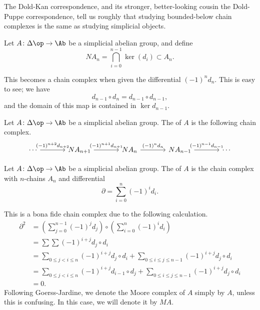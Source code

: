 \documentclass[main.tex]{subfiles}
\begin{document}
The Dold-Kan correspondence, and its stronger, better-looking cousin the Dold-Puppe correspondence, tell us roughly that studying bounded-below chain complexes is the same as studying simplicial objects.

Let $A\colon \Delta\op \to \Ab$ be a simplicial abelian group, and define
\begin{equation*}
  NA_{n} = \bigcap_{i = 0}^{n-1} \ker(d_{i}) \subset A_{n}.
\end{equation*}

This becomes a chain complex when given the differential $(-1)^{n}d_{n}$. This is easy to see; we have
\begin{equation*}
  d_{n-1} \circ d_{n} = d_{n-1} \circ d_{n-1},
\end{equation*}
and the domain of this map is contained in $\ker d_{n-1}$.

\begin{definition}
  \label{def:normalized_chain_complex}
  Let $A\colon \Delta\op \to \Ab$ be a simplicial abelian group. The  of $A$ is the following chain complex.
  \begin{equation*}
    \begin{tikzcd}[column sep=large]
      \cdots
      \arrow[r, "(-1)^{n+2}d_{n+2}"]
      & N A_{n+1}
      \arrow[r, "(-1)^{n+1}d_{n+1}"]
      & N A_{n}
      \arrow[r, "(-1)^{n}d_{n}"]
      & N A_{n-1}
      \arrow[r, "(-1)^{n-1}d_{n-1}"]
      & \cdots
    \end{tikzcd}
  \end{equation*}
\end{definition}

\begin{definition}
  \label{def:moore_complex}
  Let $A\colon \Delta\op \to \Ab$ be a simplicial abelian group. The  of $A$ is the chain complex with $n$-chains $A_{n}$ and differential
  \begin{equation*}
    \partial = \sum_{i = 0}^{n} (-1)^{i} d_{i}.
  \end{equation*}
\end{definition}

This is a bona fide chain complex due to the following calculation.
\begin{align*}
  \partial^{2} &= \left( \sum_{j = 0}^{n-1}(-1)^{j}d_{j} \right) \circ \left( \sum_{i = 0}^{n}(-1)^{i}d_{i} \right) \\
  &= \sum\sum (-1)^{i+j} d_{j} \circ d_{i} \\
  &= \sum_{0 \leq j < i \leq n} (-1)^{i+j} d_{j} \circ d_{i} + \sum_{0 \leq i \leq j \leq n-1} (-1)^{i+j} d_{j} \circ d_{i} \\
  &= \sum_{0 \leq j < i \leq n} (-1)^{i+j} d_{i-1} \circ d_{j} + \sum_{0 \leq i \leq j \leq n-1} (-1)^{i+j} d_{j} \circ d_{i} \\
  &= 0.
\end{align*}
Following Goerss-Jardine, we denote the Moore complex of $A$ simply by $A$, unless this is confusing. In this case, we will denote it by $M A$.
\end{document}
